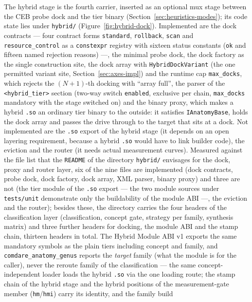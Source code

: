 \begin{nurlang}
The hybrid stage is the fourth carrier, inserted as an optional mux stage between the CEB probe dock and
the tier binary (Section~\ref{sec:heuristics-modes}); its code state lies
under \texttt{hybrid/} (Figure~\ref{fig:hybrid-dock}). Implemented are the dock contracts --- four
contract forms \texttt{standard}, \texttt{rollback}, \texttt{scan} and \texttt{resource\_control} as a
\texttt{constexpr} registry with sixteen status constants (\texttt{ok} and fifteen named rejection
reasons) ---, the minimal probe dock, the dock factory as the single construction site, the dock array
with \texttt{HybridDockVariant} (the one permitted variant site, Section~\ref{sec:axes-impl}) and the
runtime cap \texttt{max\_docks}, which rejects the $(N+1)$-th docking with \enquote{array full}, the
parser of the \texttt{<hybrid\_tier>} section (two-way switch \texttt{enabled}, exclusive per chain,
\texttt{max\_docks} mandatory with the stage switched on) and the binary proxy, which makes a hybrid
\texttt{.so} an ordinary tier binary to the outside: it satisfies \texttt{IAnatomyBase}, holds the dock array
and passes the drive through to the target that sits at a dock. Not implemented are the \texttt{.so}
export of the hybrid stage (it depends on an open layering requirement, because a hybrid \texttt{.so} would
have to link builder code), the eviction and the router (it needs actual measurement curves). Measured
against the file list that the \texttt{README} of the directory \texttt{hybrid/} envisages for the
dock, proxy and router layer, six of the nine files are implemented (dock contracts, probe dock, dock
factory, dock array, XML parser, binary proxy) and three are not (the tier module of the \texttt{.so}
export --- the two module sources under \texttt{tests/unit} demonstrate only the buildability of the
module ABI ---, the eviction and the router); besides these, the directory carries the four headers of
the classification layer (classification, concept gate, strategy per family, synthesis matrix) and three
further headers for docking, the module ABI and the stamp chain, thirteen headers in total.
The Hybrid Module ABI v1 exports the same mandatory symbols as the plain tiers including concept and
family, and \texttt{comdare\_anatomy\_genus} reports the \emph{target} family (what the module is for the
caller), never the reroute family of the classification --- the same concept-independent loader loads
the hybrid \texttt{.so} via the one loading route; the stamp chain of the hybrid stage and the hybrid positions
of the measurement-gate member (\texttt{hm}/\texttt{hmi}) carry its identity, and the family build

\end{nurlang}
